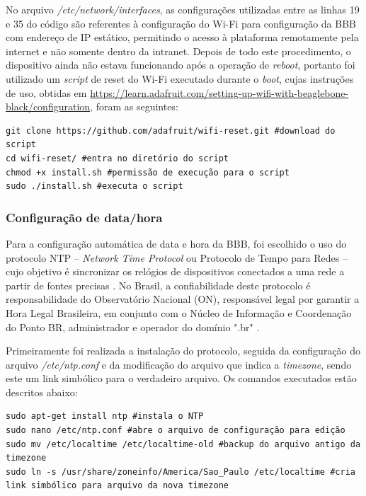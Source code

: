 No arquivo \textit{/etc/network/interfaces}, as configurações utilizadas entre as linhas 19 e 35 do código são referentes à configuração do Wi-Fi para configuração da BBB com endereço de IP estático, permitindo o acesso à plataforma remotamente pela internet e não somente dentro da intranet. Depois de todo este procedimento, o dispositivo ainda não estava funcionando após a operação de \textit{reboot}, portanto foi utilizado um \textit{script} de reset do Wi-Fi executado durante o \textit{boot}, cujas instruções de uso, obtidas em  \url{https://learn.adafruit.com/setting-up-wifi-with-beaglebone-black/configuration}, foram as seguintes:

\lstset{language=bash}
\begin{lstlisting}[frame=single, basicstyle=\linespread{0.85}\ttfamily]
git clone https://github.com/adafruit/wifi-reset.git #download do script
cd wifi-reset/ #entra no diretório do script
chmod +x install.sh #permissão de execução para o script
sudo ./install.sh #executa o script
\end{lstlisting}

\subsubsection{Configuração de data/hora}

Para a configuração automática de data e hora da BBB, foi escolhido o uso do protocolo NTP -- \textit{Network Time Protocol} ou Protocolo de Tempo para Redes -- cujo objetivo é sincronizar os relógios de dispositivos conectados a uma rede a partir de fontes precisas \cite{ntp}. No Brasil, a confiabilidade deste protocolo é responsabilidade do Observatório Nacional (ON), responsável legal por garantir a Hora Legal Brasileira, em conjunto com o Núcleo de Informação e Coordenação do Ponto BR, administrador e operador do domínio ".br"  \cite{nic,dsho}.

Primeiramente foi realizada a instalação do protocolo, seguida da configuração do arquivo \textit{/etc/ntp.conf} e da modificação do arquivo que indica a \textit{timezone}, sendo este um link simbólico para o verdadeiro arquivo. Os comandos executados estão descritos abaixo:

\lstset{language=bash}
\begin{lstlisting}[frame=single, basicstyle=\linespread{0.85}\ttfamily]
sudo apt-get install ntp #instala o NTP
sudo nano /etc/ntp.conf #abre o arquivo de configuração para edição
sudo mv /etc/localtime /etc/localtime-old #backup do arquivo antigo da timezone
sudo ln -s /usr/share/zoneinfo/America/Sao_Paulo /etc/localtime #cria link simbólico para arquivo da nova timezone
\end{lstlisting}

